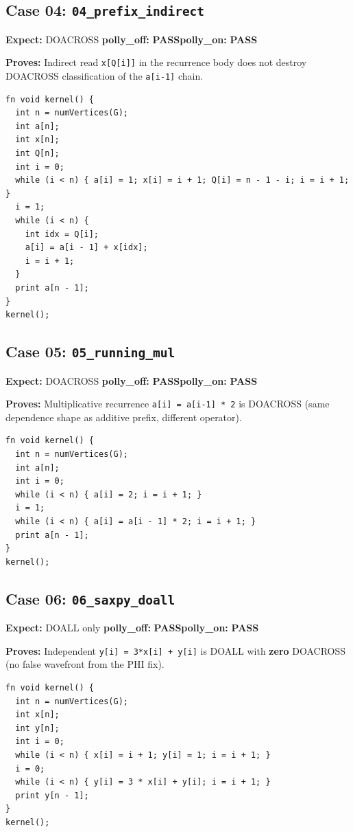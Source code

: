 \documentclass[11pt,a4paper]{article}
\newcommand{\passmark}{\textcolor{pass}{\textbf{PASS}}}
\begin{document}
\subsection{Case 04: \texttt{04\_prefix\_indirect}}
\textbf{Expect:} DOACROSS \quad \textbf{polly\_off:} \passmark \quad \textbf{polly\_on:} \passmark

\textbf{Proves:} Indirect read \texttt{x[Q[i]]} in the recurrence body does not
destroy DOACROSS classification of the \texttt{a[i-1]} chain.

\begin{lstlisting}
fn void kernel() {
  int n = numVertices(G);
  int a[n];
  int x[n];
  int Q[n];
  int i = 0;
  while (i < n) { a[i] = 1; x[i] = i + 1; Q[i] = n - 1 - i; i = i + 1; }
  i = 1;
  while (i < n) {
    int idx = Q[i];
    a[i] = a[i - 1] + x[idx];
    i = i + 1;
  }
  print a[n - 1];
}
kernel();
\end{lstlisting}

\subsection{Case 05: \texttt{05\_running\_mul}}
\textbf{Expect:} DOACROSS \quad \textbf{polly\_off:} \passmark \quad \textbf{polly\_on:} \passmark

\textbf{Proves:} Multiplicative recurrence \texttt{a[i] = a[i-1] * 2} is DOACROSS
(same dependence shape as additive prefix, different operator).

\begin{lstlisting}
fn void kernel() {
  int n = numVertices(G);
  int a[n];
  int i = 0;
  while (i < n) { a[i] = 2; i = i + 1; }
  i = 1;
  while (i < n) { a[i] = a[i - 1] * 2; i = i + 1; }
  print a[n - 1];
}
kernel();
\end{lstlisting}

\subsection{Case 06: \texttt{06\_saxpy\_doall}}
\textbf{Expect:} DOALL only \quad \textbf{polly\_off:} \passmark \quad \textbf{polly\_on:} \passmark

\textbf{Proves:} Independent \texttt{y[i] = 3*x[i] + y[i]} is DOALL with
\textbf{zero} DOACROSS (no false wavefront from the PHI fix).

\begin{lstlisting}
fn void kernel() {
  int n = numVertices(G);
  int x[n];
  int y[n];
  int i = 0;
  while (i < n) { x[i] = i + 1; y[i] = 1; i = i + 1; }
  i = 0;
  while (i < n) { y[i] = 3 * x[i] + y[i]; i = i + 1; }
  print y[n - 1];
}
kernel();
\end{lstlisting}
\end{document}
